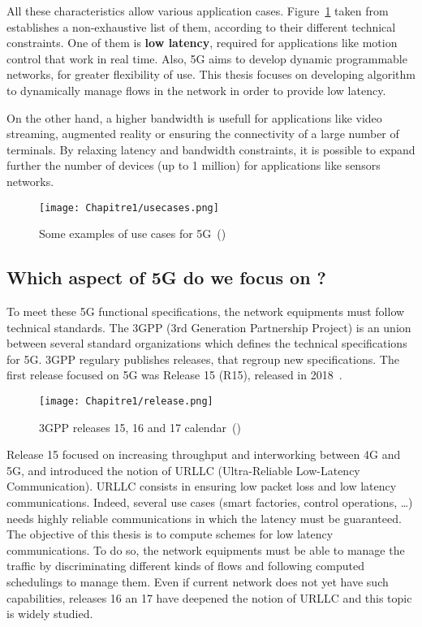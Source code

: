 All these characteristics allow various application cases. Figure~\ref{fig:usecases} taken from~\cite{5GACIA} establishes a non-exhaustive list of them, according to their different technical constraints. One of them is \textbf{low latency}, required for applications like motion control that work in real time. Also,  5G aims to develop dynamic programmable networks, for greater flexibility of use. This thesis focuses on developing algorithm to dynamically manage flows in the network in order to provide low latency.

On the other hand, a higher bandwidth is usefull for applications like video streaming, augmented reality or ensuring the connectivity of a large number of terminals. By relaxing latency and bandwidth constraints, it is possible to expand further the number of devices (up to 1 million) for applications like sensors networks.

  \begin{figure}[h] 
      \begin{center}
      \texttt{[image: Chapitre1/usecases.png]}
      \end{center}
      \caption{Some examples of use cases for 5G~(\cite{5GACIA})}\label{fig:usecases}
      \end{figure}



\subsection{Which aspect of 5G do we focus on ?}


To meet these 5G functional specifications, the network equipments must follow technical standards. The 3GPP (3rd Generation Partnership Project) is an union between several standard organizations which defines the technical specifications for 5G. 3GPP regulary publishes releases, that regroup new specifications. The first release focused on 5G was Release 15 (R15), released in 2018~\cite{RELEASENOKIA}.  

  \begin{figure}[h]
      \begin{center}
      \texttt{[image: Chapitre1/release.png]}
      \end{center}
      \caption{3GPP releases 15, 16 and 17 calendar~(\cite{RELEASENOKIA})}\label{fig:release}
      \end{figure}
  

Release 15 focused on increasing throughput and interworking between 4G and 5G, and introduced the notion of URLLC (Ultra-Reliable Low-Latency Communication). URLLC consists in ensuring low packet loss and low latency communications. Indeed, several use cases (smart factories, control operations, \dots) needs highly reliable communications in which the latency must be guaranteed. 
The objective of this thesis is to compute schemes for low latency communications. To do so, the network equipments must be able to manage the traffic by discriminating different kinds of flows and following computed schedulings to manage them. Even if current network does not yet have such capabilities, releases 16 an 17 have deepened the notion of URLLC and this topic is widely studied. 

